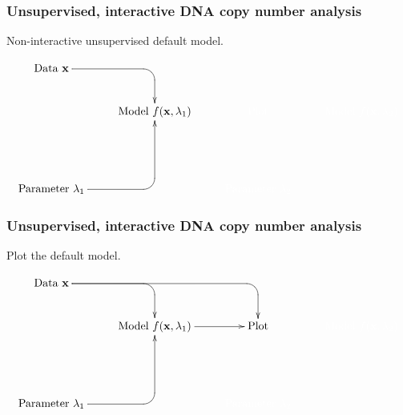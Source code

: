 \documentclass{beamer}
\begin{document}
\begin{frame}
  \frametitle{Unsupervised, interactive DNA copy number analysis}
  
  Non-interactive unsupervised default model.
  
  \small

  \begin{displaymath}
  \xymatrix{
    \text{Data $\mathbf x$}
    \ar `[r] [dr] 
    & \text{ }
    & \text{ }
    & \text{ }
    \\
    & 
    \text{Model $f(\mathbf x, \lambda_1)$} 
    & 
    \textcolor{white}{\text{Plot}}
    &
    \color{white}{ \text{Model $f(\mathbf x, \lambda_2)$} }
    \\
    & 
    &
    \\
    \text{Parameter $\lambda_1$} 
    \ar `r[ruu] [ruu]
    & \text{ }
    & \color{white}{ \text{Parameter $\lambda_2$} }
  }
  \end{displaymath}
\end{frame}

\begin{frame}
  \frametitle{Unsupervised, interactive DNA copy number analysis}

  Plot the default model.
  
  \small

  \begin{displaymath}
  \xymatrix{
    \text{Data $\mathbf x$}
    \ar `[r] [dr] 
    \ar `r[rr] [drr] 
    & \text{ }
    & \text{ }
    & \text{ }
    \\
    & 
    \text{Model $f(\mathbf x, \lambda_1)$} 
    \ar [r]
    & 
    \text{Plot}
    &
    \color{white}{ \text{Model $f(\mathbf x, \lambda_2)$} }
    \\
    & 
    &
    \\
    \text{Parameter $\lambda_1$} 
    \ar `r[ruu] [ruu]
    & \text{ }
    & \color{white}{ \text{Parameter $\lambda_2$} }
  }
  \end{displaymath}
\end{frame}
\end{document}
